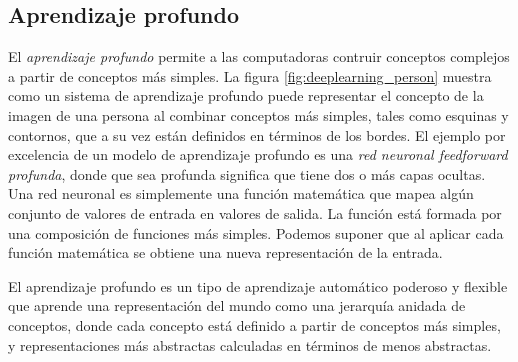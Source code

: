 


\subsection{Aprendizaje profundo}
El \textit{aprendizaje profundo} permite a las computadoras contruir conceptos complejos
a partir de conceptos más simples. La figura 
\ref{fig:deeplearning_person} muestra como un sistema de aprendizaje profundo
puede representar el concepto de la imagen de una persona al combinar conceptos más simples, tales
como esquinas y contornos, que a su vez están definidos en términos de los bordes.
El ejemplo por excelencia de un modelo de aprendizaje profundo es una \textit{red neuronal feedforward
profunda}, donde que sea profunda significa que tiene dos o más capas ocultas. Una red neuronal
es simplemente una función matemática que mapea algún conjunto de valores de entrada en 
valores de salida. La función está formada por una composición de funciones más simples.
Podemos suponer que al aplicar cada función matemática se obtiene una nueva representación de la
entrada.\\

\begin{remark}

El aprendizaje profundo es un tipo de aprendizaje automático
poderoso y flexible que aprende una representación del mundo
como una jerarquía anidada de conceptos, donde 
cada concepto está definido a partir de conceptos más simples,
y representaciones más abstractas calculadas en términos
de menos abstractas.

\end{remark}


